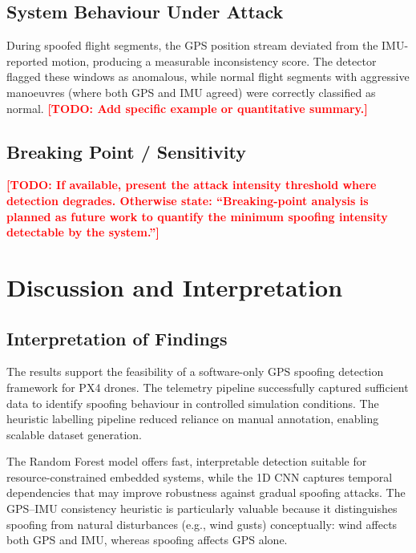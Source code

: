 \documentclass[11pt,a4paper]{article}
\newcommand{\todo}[1]{\textcolor{red}{\textbf{[TODO: #1]}}}
\begin{document}
\subsection{System Behaviour Under Attack}

During spoofed flight segments, the GPS position stream deviated from the IMU-reported motion, producing a measurable inconsistency score. The detector flagged these windows as anomalous, while normal flight segments with aggressive manoeuvres (where both GPS and IMU agreed) were correctly classified as normal. \todo{Add specific example or quantitative summary.}

\subsection{Breaking Point / Sensitivity}

\todo{If available, present the attack intensity threshold where detection degrades. Otherwise state: ``Breaking-point analysis is planned as future work to quantify the minimum spoofing intensity detectable by the system.''}

\section{Discussion and Interpretation}

\subsection{Interpretation of Findings}

The results support the feasibility of a software-only GPS spoofing detection framework for PX4 drones. The telemetry pipeline successfully captured sufficient data to identify spoofing behaviour in controlled simulation conditions. The heuristic labelling pipeline reduced reliance on manual annotation, enabling scalable dataset generation.

The Random Forest model offers fast, interpretable detection suitable for resource-constrained embedded systems, while the 1D CNN captures temporal dependencies that may improve robustness against gradual spoofing attacks. The GPS--IMU consistency heuristic is particularly valuable because it distinguishes spoofing from natural disturbances (e.g., wind gusts) conceptually: wind affects both GPS and IMU, whereas spoofing affects GPS alone.
\end{document}
